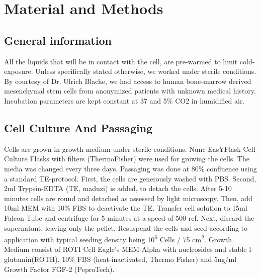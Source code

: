 \newcommand{\product}{\textit}

\chapter{Material and Methods}

\section{General information}
All the liquids that will be in contact with the cell, are pre-warmed to limit cold-exposure. Unless specifically stated otherwise, we worked under sterile conditions. By courtesy of Dr. Ulrich Blache, we had access to human bone-marrow derived mesenchymal stem cells from anonymized patients with unknown medical history. Incubation parameters are kept constant at 37 \degC{} and 5\% CO2 in humidified air.

\section{Cell Culture And Passaging}

Cells are grown in growth medium under sterile conditions. Nunc\texttrademark{} EasYFlask\texttrademark{} Cell Culture Flasks with filters (ThermoFisher) were used for growing the cells. The media was changed every three days. Passaging was done at 80\% confluence using a standard TE-protocol. First, the cells are generously washed with PBS. Second, 2ml Trypsin-EDTA (TE, maduzi) is added, to detach the cells. After 5-10 minutes cells are round and detached as assessed by light microscopy. Then, add 10ml MEM\textalpha{} with 10\% FBS to deactivate the TE. Transfer cell solution to 15ml Falcon Tube and centrifuge for 5 minutes at a speed of 500 rcf. Next, discard the supernatant, leaving only the pellet. Resuspend the cells and seed according to application with typical seeding density being 10\textsuperscript{6} Cells / 75 cm\textsuperscript{2}. 
Growth Medium consist of ROTI\textregistered{} Cell Eagle's MEM-Alpha with nucleosides and stable l-glutamin(ROTH), 10\% FBS (heat-inactivated, Thermo Fisher) and 5ng/ml Growth Factor FGF-2 (PeproTech).

